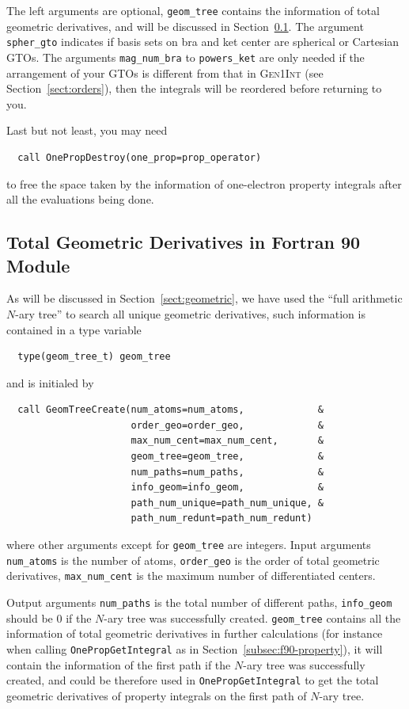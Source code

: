 \documentclass[a4paper,11pt,twoside,openright]{book}
\begin{document}
The left arguments are optional, \verb|geom_tree| contains the information of total geometric
derivatives, and will be discussed in Section~\ref{subsec:fortran-geom}. The argument \verb|spher_gto|
indicates if basis sets on bra and ket center are spherical or Cartesian GTOs. The arguments
\verb|mag_num_bra| to \verb|powers_ket| are only needed if the arrangement of your GTOs is
different from that in \textsc{Gen1Int} (see Section~\ref{sect:orders}), then the integrals will be
reordered before returning to you.

Last but not least, you may need
\begin{verbatim}
  call OnePropDestroy(one_prop=prop_operator)
\end{verbatim}
to free the space taken by the information of one-electron property integrals after all the evaluations
being done.

\subsection{Total Geometric Derivatives in Fortran 90 Module}
\label{subsec:fortran-geom}

As will be discussed in Section~\ref{sect:geometric}, we have used the ``full arithmetic $N$-ary tree'' to search
all unique geometric derivatives, such information is contained in a type variable
\begin{verbatim}
  type(geom_tree_t) geom_tree
\end{verbatim}
and is initialed by
\begin{verbatim}
  call GeomTreeCreate(num_atoms=num_atoms,             &
                      order_geo=order_geo,             &
                      max_num_cent=max_num_cent,       &
                      geom_tree=geom_tree,             &
                      num_paths=num_paths,             &
                      info_geom=info_geom,             &
                      path_num_unique=path_num_unique, &
                      path_num_redunt=path_num_redunt)
\end{verbatim}
where other arguments except for \verb|geom_tree| are integers. Input arguments
\verb|num_atoms| is the number of atoms, \verb|order_geo| is the order of total
geometric derivatives, \verb|max_num_cent| is the maximum number of differentiated centers.

Output arguments \verb|num_paths| is the total number of different paths, \verb|info_geom|
should be 0 if the $N$-ary tree was successfully created. \verb|geom_tree| contains all the
information of total geometric derivatives in further calculations (for instance when calling
\verb|OnePropGetIntegral| as in Section~\ref{subsec:f90-property}), it will contain the information
of the first path if the $N$-ary tree was successfully created, and could be therefore used in
\verb|OnePropGetIntegral| to get the total geometric derivatives of property integrals on the first
path of $N$-ary tree.
\end{document}
